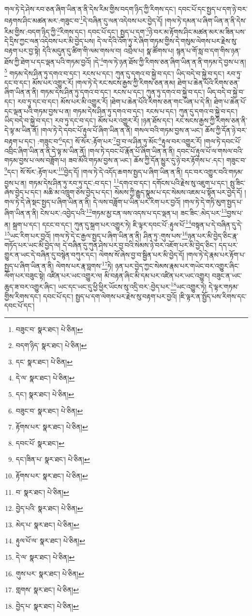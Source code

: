 གལ་ཏེ་དེ་ཤེས་རབ་ཅན་ཞིག་ཡིན་ན་ནི་དེས་རིམ་གྱིས་བདག་ཉིད་ཀྱི་རིགས་དང་། དབང་པོ་དང་སྤྱད་པ་དག་ཉེ་བར་བརྟགས་ཤིང་མཚན་མར་:གཟུང་བ་\footnote{བཟུང་བ་  སྣར་ཐང་།  པེ་ཅིན། }དེ་བཞིན་དུ་ལན་འདེབས་པར་བྱེད་དོ། །གལ་ཏེ་དམན་པ་ཞིག་ཡིན་ན་ནི་དེས་རིམ་གྱིས་:བདག་ཉིད་ཀྱི་\footnote{བདག་ཉིད་  སྣར་ཐང་།  པེ་ཅིན། }རིགས་དང་། དབང་པོ་དང་། སྤྱད་པ་དག་\footnote{དང་  སྣར་ཐང་།  པེ་ཅིན། }ཉེ་བར་མ་རྟོགས་ཤིང་མཚན་མར་མ་ཟིན་པས་དེ་དྲིས་ཀྱང་ལན་འདེབས་པར་མི་བྱེད་པས། དེ་ལ་དེའི་འོག་ཏུ་རེ་ཞིག་གཏམ་གྱིས་དེ་གསུམ་ལེགས་པར་རྗེས་སུ་བརྟག་པར་བྱ་སྟེ། དེའི་མདུན་དུ་ཚིག་གི་ལམ་གསལ་བ། འབྲེལ་པ། སྣ་ཚོགས་པ། སྙན་པ་གོ་སླ་བ་དག་གིས་ཉན་ཐོས་ཀྱི་ཐེག་པ་དང་ལྡན་པའི་གཏམ་བྱའོ། །དེ་\footnote{དེ་ལ་  སྣར་ཐང་།  པེ་ཅིན། }གལ་ཏེ་ཉན་ཐོས་ཀྱི་རིགས་ཅན་ཞིག་ཡིན་ན་ནི་གཏམ་དེ་བྱས་པ་ན།\footnote{དང་།  སྣར་ཐང་།  པེ་ཅིན། } གཏམ་དེས་ཤིན་ཏུ་དགའ་བ་དང་། རངས་པ་དང་། ཀུན་དུ་དགའ་བ་སྐྱེ་བ་དང་། ཡིད་བདེ་བ་སྐྱེ་བ་དང་། རབ་ཏུ་དང་བ་དང་། མོས་པར་འགྱུར་རོ། །གལ་ཏེ་དེ་རང་སངས་རྒྱས་ཀྱི་རིགས་ཅན་ནམ། ཐེག་པ་ཆེན་པོའི་རིགས་ཅན་ཞིག་ཡིན་ན་ནི། གཏམ་དེས་ཤིན་ཏུ་དགའ་བ་དང་། རངས་པ་དང་། ཀུན་ཏུ་དགའ་བ་སྐྱེ་བ་དང་། ཡིད་བདེ་བ་སྐྱེ་བ་དང་། རབ་ཏུ་དང་བ་དང་། མོས་པར་མི་འགྱུར་རོ། །ཐེག་པ་ཆེན་པོའི་རིགས་ཅན་གང་ཡིན་པ་དེ་ནི། ཐེག་པ་ཆེན་པོ་དང་ལྡན་པའི་གཏམ་བྱས་པ་ན། གཏམ་དེས་ཤིན་ཏུ་དགའ་བ་དང་། རངས་པ་དང་། ཀུན་དུ་དགའ་བ་སྐྱེ་བ་དང་། ཡིད་བདེ་བ་སྐྱེ་བ་དང་། རབ་ཏུ་དང་བ་དང་། མོས་པར་འགྱུར་རོ། །ཉན་ཐོས་དང་། རང་སངས་རྒྱས་ཀྱི་རིགས་ཅན་ནི་དེ་ལྟ་མ་ཡིན་ནོ། །གལ་ཏེ་དེ་དབང་པོ་རྟུལ་པོ་ཞིག་ཡིན་ན་ནི། གསལ་བའི་གཏམ་བྱས་ན་ཡང་། ཆོས་ཀྱི་དོན་ཉེ་བར་བརྟག་པ་དང་། :གཟུང་བ་\footnote{བཟུང་བ་  སྣར་ཐང་།  པེ་ཅིན། }དང་། སོ་སོར་:རྟོག་པར་\footnote{རྟོགས་པར་  སྣར་ཐང་།  པེ་ཅིན། }བྱ་བ་ལ་ཤིན་ཏུ་མོང་\footnote{དབང་པོ་  སྣར་ཐང་། }རྟུལ་བར་འགྱུར་རོ། །གལ་ཏེ་དབང་པོ་འབྲིང་ཞིག་ཡིན་ན་ནི་དེ་ལྟ་མ་ཡིན་ནོ། །གལ་ཏེ་དབང་པོ་རྣོན་པོ་ཞིག་ཡིན་ན་ནི། དབང་པོ་རྟུལ་པོ་ལ་གསལ་བའི་གཏམ་བྱས་པ་ལས་བཟློག་པ། ཟབ་མོའི་གཏམ་བྱས་ན་ཡང་། ཆོས་ཀྱི་དོན་མྱུར་དུ་ཉེ་བར་རྟོགས་པ་:དང་། གཟུང་བ་\footnote{དང་།ཟིན་པ་  སྣར་ཐང་།  པེ་ཅིན། }དང་། སོ་སོར་:རྟོག་པར་\footnote{རྟོགས་པར་  སྣར་ཐང་།  པེ་ཅིན། }བྱེད་དོ། །གལ་ཏེ་དེ་འདོད་ཆགས་སྤྱད་པ་ཞིག་ཡིན་ན་ནི། དང་བར་འགྱུར་བའི་གཏམ་བྱས་པ་ན། གཏམ་དེས་ཤིན་ཏུ་རབ་ཏུ་དང་:བ་དང་། \footnote{བ་  སྣར་ཐང་།  པེ་ཅིན། }དགའ་བ་དང་། དགོངས་པའི་རྗེས་སུ་འཇུག་པ་དང་། སྤུ་ཟིང་ཞེས་བྱེད་པ་དང་། མཆི་མ་འཁྲུག་ཅེས་བྱེད་པ་དང་། སེམས་ཀྱི་རྒྱུད་སྣུམ་པ་དང་སེམས་འཇམ་པ་སྟོན་པར་བྱེད་དོ། །གལ་ཏེ་དེ་ཞེ་སྡང་སྤྱད་པ་ཞིག་ཡིན་ན་ནི། དེ་ལས་བཟློག་པ་ཡིན་པར་རིག་པར་བྱའོ། །གལ་ཏེ་དེ་གཏི་མུག་སྤྱད་པ་ཞིག་ཡིན་ན་ནི། ངེས་པར་:འབྱེད་པའི་\footnote{བྱེད་པའི་  སྣར་ཐང་།  པེ་ཅིན། }གཏམ་མྱ་ངན་ལས་འདས་པ་དང་ལྡན་པ། ཟང་ཟིང་:མེད་པར་\footnote{མེད་པ་  སྣར་ཐང་།  པེ་ཅིན། }བྱས་པ་ན། སྐྲག་པ་དང་། དངང་བ་དང་། ཀུན་དུ་སྐྲག་པར་འགྱུར་ཏེ། ཇི་ལྟར་དབང་པོ་:རྟུལ་པོ་\footnote{རྟུལ་པོ་ལ་  སྣར་ཐང་།  པེ་ཅིན། }བསྟན་པ་དེ་བཞིན་དུ་དེ་\footnote{དེ་ལ་  སྣར་ཐང་།  པེ་ཅིན། }ཡང་རིག་པར་བྱའོ། །གལ་ཏེ་དེ་ང་རྒྱལ་སྤྱད་པ་ཞིག་ཡིན་ན་ནི། ཤིན་ཏུ་:གུས་པས་\footnote{གུས་པར་  སྣར་ཐང་།  པེ་ཅིན། }ཉན་པར་མི་བྱེད་ཅིང་རྣ་གཏོད་པར་ཡང་མི་བྱེད་ལ། དེ་བཞིན་དུ་ཀུན་ཤེས་པར་བྱ་བའི་སེམས་ཉེ་བར་འཇོག་པར་མི་བྱེད་ཅིང་། དད་པར་གྱུར་ན་ཡང་དེ་བཞིན་དུ་བསྙེན་བཀུར་དང་། ལེགས་སོ་ཞེས་བྱ་བ་སྦྱིན་པར་མི་བྱེད་དོ། །གལ་ཏེ་དེ་རྣམ་པར་རྟོག་པ་སྤྱད་པ་ཞིག་ཡིན་ན་ནི། ལེགས་པར་རྣ་བླགས་\footnote{གླགས་  སྣར་ཐང་།  པེ་ཅིན། }ཏེ། ཉན་པར་བྱེད་ཀྱང་སེམས་རྣམ་པར་གཡེང་བར་འགྱུར་ཞིང་ལོག་པར་བཟུང་སྟེ། འཛིན་པར་ཡང་འགྱུར་ལ། མི་བརྟན་ཞིང་མི་དམ་པར་འཛིན་པར་ཡང་འགྱུར། བཟུང་ན་ཡང་ཆུད་ཟ་བར་འགྱུར་ཞིང་། ཡང་དང་ཡང་དུ་ཕྱི་ཕྱིར་ཡོངས་སུ་འདྲི་བར་:བྱེད་པར་\footnote{བྱེད་པ་  སྣར་ཐང་།  པེ་ཅིན། }ཡང་འགྱུར་ཏེ། དེ་ལྟར་གཏམ་གྱིས་རིགས་དང་། དབང་པོ་དང་། སྤྱད་པ་དག་ལེགས་པར་རྗེས་སུ་བརྟག་པར་བྱའོ། །ཇི་ལྟར་ན་སྤྱོད་པས་རིགས་དང་དབང་པོ་དང་། 